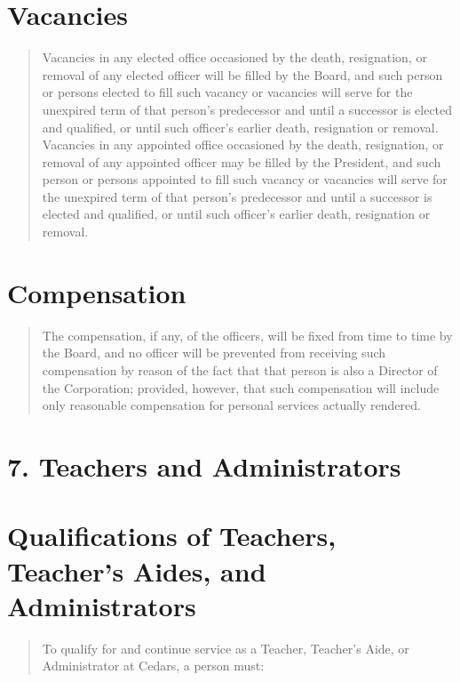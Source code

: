 \documentclass[
]{book}
\begin{document}
\section{Vacancies}\label{vacancies}

\begin{quote}
Vacancies in any elected office occasioned by the death, resignation,
or removal of any elected officer will be filled by the Board, and
such person or persons elected to fill such vacancy or vacancies will
serve for the unexpired term of that person's predecessor and until a
successor is elected and qualified, or until such officer's earlier
death, resignation or removal. Vacancies in any appointed office
occasioned by the death, resignation, or removal of any appointed
officer may be filled by the President, and such person or persons
appointed to fill such vacancy or vacancies will serve for the
unexpired term of that person's predecessor and until a successor is
elected and qualified, or until such officer's earlier death,
resignation or removal.
\end{quote}

\section{Compensation}\label{compensation}

\begin{quote}
The compensation, if any, of the officers, will be fixed from time to
time by the Board, and no officer will be prevented from receiving
such compensation by reason of the fact that that person is also a
Director of the Corporation; provided, however, that such compensation
will include only reasonable compensation for personal services
actually rendered.
\end{quote}

\section{7. Teachers and Administrators}\label{teachers-and-administrators}

\section{Qualifications of Teachers, Teacher's Aides, and Administrators}\label{qualifications-of-teachers-teachers-aides-and-administrators}

\begin{quote}
To qualify for and continue service as a Teacher, Teacher's Aide, or
Administrator at Cedars, a person must:
\end{quote}
\end{document}
